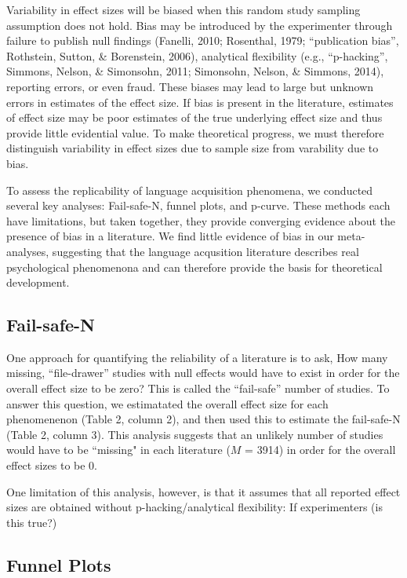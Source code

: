 \documentclass[american,floatsintext,man]{apa6}
\begin{document}
Variability in effect sizes will be biased when this random study
sampling assumption does not hold. Bias may be introduced by the
experimenter through failure to publish null findings (Fanelli, 2010;
Rosenthal, 1979; ``publication bias'', Rothstein, Sutton, \& Borenstein,
2006), analytical flexibility (e.g., ``p-hacking'', Simmons, Nelson, \&
Simonsohn, 2011; Simonsohn, Nelson, \& Simmons, 2014), reporting errors,
or even fraud. These biases may lead to large but unknown errors in
estimates of the effect size. If bias is present in the literature,
estimates of effect size may be poor estimates of the true underlying
effect size and thus provide little evidential value. To make
theoretical progress, we must therefore distinguish variability in
effect sizes due to sample size from varability due to bias.

To assess the replicability of language acquisition phenomena, we
conducted several key analyses: Fail-safe-N, funnel plots, and p-curve.
These methods each have limitations, but taken together, they provide
converging evidence about the presence of bias in a literature. We find
little evidence of bias in our meta-analyses, suggesting that the
language acqusition literature describes real psychological phenomenona
and can therefore provide the basis for theoretical development.

\subsection{Fail-safe-N}\label{fail-safe-n}

One approach for quantifying the reliability of a literature is to ask,
How many missing, \enquote{file-drawer} studies with null effects would
have to exist in order for the overall effect size to be zero? This is
called the \enquote{fail-safe} number of studies. To answer this
question, we estimatated the overall effect size for each phenomenenon
(Table 2, column 2), and then used this to estimate the fail-safe-N
(Table 2, column 3). This analysis suggests that an unlikely number of
studies would have to be ``missing" in each literature (\(M\) = 3914) in
order for the overall effect sizes to be 0.

One limitation of this analysis, however, is that it assumes that all
reported effect sizes are obtained without p-hacking/analytical
flexibility: If experimenters (is this true?)

\subsection{Funnel Plots}\label{funnel-plots}
\end{document}
